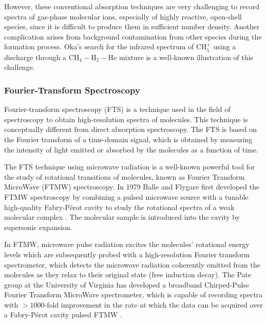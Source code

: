 However, these conventional absorption techniques are very challenging to
record spectra of gas-phase molecular ions, especially of highly reactive,
open-shell species, since it is difficult to produce them in sufficient
number density. Another complication arises from background contamination from
other species during the formation process. Oka's \cite{oka_taming_2015} search
for the infrared spectrum of CH$_5^+$ using a discharge through a
CH$_4-$H$_2-$He mixture is a well-known illustration of this challenge.

\subsubsection*{Fourier-Transform Spectroscopy}

Fourier-transform spectroscopy (FTS) is a technique used in the field of spectroscopy to obtain high-resolution spectra of molecules. This technique is conceptually different from direct absorption spectroscopy. 
The FTS is based on the Fourier transform of a time-domain signal, which is obtained by 
measuring the intensity of light emitted or absorbed by the molecules as a function of time.

The FTS technique using microwave radiation is a well-known powerful tool for the study of rotational transitions of molecules, known as Fourier Transform MicroWave (FTMW) spectroscopy. In 1979 Balle and Flygare first developed the FTMW spectroscopy by combining a pulsed microwave source with a tunable high-quality Fabry-P\'erot cavity to study the rotational spectra of a weak molecular complex \cite{balle_new_1979, balle_fabryperot_1981}. The molecular sample is introduced into the cavity by supersonic expansion.

In FTMW, microwave pulse radiation excites the molecules' rotational energy levels which are subsequently probed with a high-resolution Fourier transform spectrometer, which detects the microwave radiation coherently emitted from the molecules as they relax to their original state (free induction decay).
The Pate group at the University of Virginia has developed a broadband Chirped-Pulse Fourier Transform MicroWave  spectrometer, which is capable of recording spectra with $>1000$-fold improvement in the rate at which the data can be acquired over a Fabry-P\'erot cavity pulsed FTMW \cite{brown_rotational_2006, brown_broadband_2008, park_perspective_2016}.

